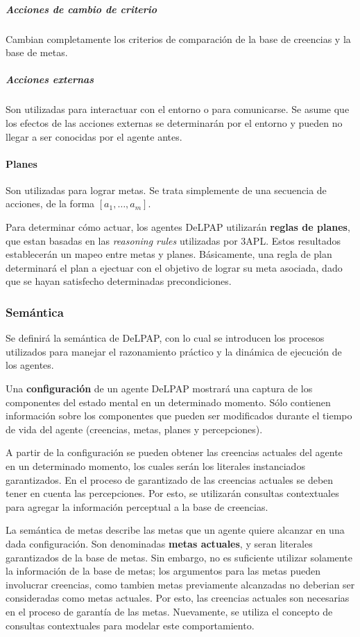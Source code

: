 \subparagraph{Acciones de cambio de criterio}

Cambian completamente los criterios de comparación de la base de creencias y la base de metas.

\subparagraph{Acciones externas}

Son utilizadas para interactuar con el entorno o para comunicarse. Se asume que los efectos de las acciones externas se determinarán por el entorno y pueden no llegar a ser conocidas por el agente antes.

\paragraph{Planes}

Son utilizadas para lograr metas. Se trata simplemente de una secuencia de acciones, de la forma 
$[a_1,\ldots,a_m]$. 

Para determinar cómo actuar, los agentes DeLPAP utilizarán
\textbf{reglas de planes}, que estan basadas en las \textit{reasoning rules} utilizadas por 3APL.
Estos resultados establecerán un mapeo entre metas y planes. Básicamente, una regla de plan
determinará el plan a ejectuar con el objetivo de lograr su meta asociada, dado que se hayan
satisfecho determinadas precondiciones.

\subsubsection{Semántica}

Se definirá la semántica de DeLPAP, con lo cual se introducen los procesos utilizados para manejar
el razonamiento práctico y la dinámica de ejecución de los agentes.

Una \textbf{configuración} de un agente DeLPAP mostrará una captura de los componentes del estado mental en un
determinado momento. Sólo contienen información sobre los componentes que pueden ser modificados
durante el tiempo de vida del agente (creencias, metas, planes y percepciones).

A partir de la configuración se pueden obtener las creencias actuales del agente en un determinado 
momento, los cuales serán los literales instanciados garantizados. En el proceso de garantizado de las
creencias actuales se deben tener en cuenta las percepciones. Por esto, se utilizarán consultas 
contextuales para agregar la información perceptual a la base de creencias.

La semántica de metas describe las metas que un agente quiere alcanzar en una dada configuración. 
Son denominadas \textbf{metas actuales}, y seran literales garantizados de la base de metas. Sin 
embargo, no es suficiente utilizar solamente la información de la base de metas; los argumentos para
las metas pueden involucrar creencias, como tambien metas previamente alcanzadas no deberian ser 
consideradas como metas actuales. Por esto, las creencias actuales son necesarias en el proceso de 
garantía de las metas. Nuevamente, se utiliza el concepto de consultas contextuales para modelar este
comportamiento.

